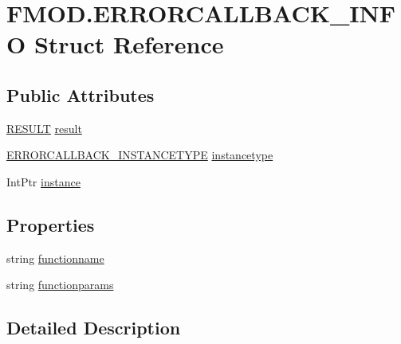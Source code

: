 \hypertarget{struct_f_m_o_d_1_1_e_r_r_o_r_c_a_l_l_b_a_c_k___i_n_f_o}{}\section{F\+M\+O\+D.\+E\+R\+R\+O\+R\+C\+A\+L\+L\+B\+A\+C\+K\+\_\+\+I\+N\+FO Struct Reference}
\label{struct_f_m_o_d_1_1_e_r_r_o_r_c_a_l_l_b_a_c_k___i_n_f_o}
\subsection*{Public Attributes}
\begin{DoxyCompactItemize}
\item 
\hyperlink{namespace_f_m_o_d_a305d1176ef3f8c8815861a60407ac33d}{R\+E\+S\+U\+LT} \hyperlink{struct_f_m_o_d_1_1_e_r_r_o_r_c_a_l_l_b_a_c_k___i_n_f_o_a5fae99e4b431149c37a2eb4dd8043e09}{result}
\item 
\hyperlink{namespace_f_m_o_d_a6822b9747e43fffbe2a948fa7f62d00c}{E\+R\+R\+O\+R\+C\+A\+L\+L\+B\+A\+C\+K\+\_\+\+I\+N\+S\+T\+A\+N\+C\+E\+T\+Y\+PE} \hyperlink{struct_f_m_o_d_1_1_e_r_r_o_r_c_a_l_l_b_a_c_k___i_n_f_o_afa180c9ba2e9d16244deb0dc3ef671c2}{instancetype}
\item 
Int\+Ptr \hyperlink{struct_f_m_o_d_1_1_e_r_r_o_r_c_a_l_l_b_a_c_k___i_n_f_o_a2136c42caea4184cf1c2a57736352ab2}{instance}
\end{DoxyCompactItemize}
\subsection*{Properties}
\begin{DoxyCompactItemize}
\item 
string \hyperlink{struct_f_m_o_d_1_1_e_r_r_o_r_c_a_l_l_b_a_c_k___i_n_f_o_a7ad1ff8f4c39207bc27dc9ed63baf343}{functionname}
\item 
string \hyperlink{struct_f_m_o_d_1_1_e_r_r_o_r_c_a_l_l_b_a_c_k___i_n_f_o_a13d8d72cef11a86686cb50105ce24702}{functionparams}
\end{DoxyCompactItemize}


\subsection{Detailed Description}


